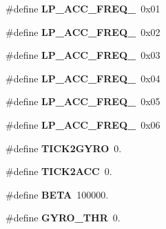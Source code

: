 \begin{DoxyCompactItemize}
\#define {\bfseries L\+P\+\_\+\+A\+C\+C\+\_\+\+F\+R\+E\+Q\+\_}~0x01
\item 
\mbox{\label{_i_m_u__functions_8h_a41579dc29c31b4796ecd75c3de7e6a8c}} 
\#define {\bfseries L\+P\+\_\+\+A\+C\+C\+\_\+\+F\+R\+E\+Q\+\_}~0x02
\item 
\mbox{\label{_i_m_u__functions_8h_a54475e6bcd9ca1653060835988731012}} 
\#define {\bfseries L\+P\+\_\+\+A\+C\+C\+\_\+\+F\+R\+E\+Q\+\_}~0x03
\item 
\mbox{\label{_i_m_u__functions_8h_a0ad395b37af58674a126467bcecaca67}} 
\#define {\bfseries L\+P\+\_\+\+A\+C\+C\+\_\+\+F\+R\+E\+Q\+\_}~0x04
\item 
\mbox{\label{_i_m_u__functions_8h_a5260837fcf49e2a7db7cf7f062193dac}} 
\#define {\bfseries L\+P\+\_\+\+A\+C\+C\+\_\+\+F\+R\+E\+Q\+\_}~0x05
\item 
\mbox{\label{_i_m_u__functions_8h_a90496543ad22bc9c8e18c04ffe2ef65a}} 
\#define {\bfseries L\+P\+\_\+\+A\+C\+C\+\_\+\+F\+R\+E\+Q\+\_}~0x06
\item 
\mbox{\label{_i_m_u__functions_8h_a447fa9b5c261de8bd2c70d7bb68f9fad}} 
\#define {\bfseries T\+I\+C\+K2\+G\+Y\+RO}~0.
\item 
\mbox{\label{_i_m_u__functions_8h_a553b95dd1fedb0cc5c10f6291e5e1516}} 
\#define {\bfseries T\+I\+C\+K2\+A\+CC}~0.
\item 
\mbox{\label{_i_m_u__functions_8h_a1b996515309fc3c03449912bb33046e3}} 
\#define {\bfseries B\+E\+TA}~100000.
\item 
\mbox{\label{_i_m_u__functions_8h_a11f6bcc58aee4b8a1346110de1046108}} 
\#define {\bfseries G\+Y\+R\+O\+\_\+\+T\+HR}~0.
\end{DoxyCompactItemize}
